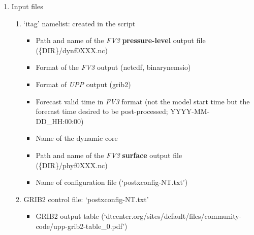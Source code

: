 \documentclass[11pt,fleqn]{report}              %
\begin{document}
\begin{enumerate}

\item Input files
\begin{enumerate}
\item `itag' namelist: created in the script
\begin{itemize}
\item Path and name of the {\it FV3} {\bf pressure-level} output file (\{DIR\}/dynf0XXX.nc)
\item Format of the {\it FV3} output (netcdf, binarynemsio)
\item Format of {\it UPP} output (grib2)
\item Forecast valid time in {\it FV3} format (not the model start time but the forecast time desired to be post-processed; YYYY-MM-DD\_HH:00:00)
\item Name of the dynamic core
\item Path and name of the {\it FV3} {\bf surface} output file (\{DIR\}/phyf0XXX.nc)
\item Name of configuration file (`postxconfig-NT.txt')
\end{itemize}
\item GRIB2 control file: `postxconfig-NT.txt'
\begin{itemize}
\item GRIB2 output table (`dtcenter.org/sites/default/files/community-code/upp-grib2-table\_0.pdf')


\end{itemize}
\end{enumerate}
\end{enumerate}
\end{document}
